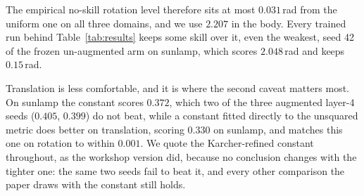 The empirical no-skill rotation level therefore sits at most $0.031$\,rad from the uniform
one on all three domains, and we use $2.207$ in the body. Every trained run behind
Table~\ref{tab:results} keeps some skill over it, even the weakest, seed 42 of the frozen
un-augmented arm on sunlamp, which scores $2.048$\,rad and keeps $0.15$\,rad.

Translation is less comfortable, and it is where the second caveat matters most. On sunlamp
the constant scores $0.372$, which two of the three augmented layer-4 seeds ($0.405$, $0.399$)
do not beat, while a constant fitted directly to the unsquared metric does better on
translation, scoring
$0.330$ on sunlamp, and matches this one on rotation to within $0.001$. We quote the
Karcher-refined constant throughout, as the workshop version did, because no conclusion
changes with the tighter one: the same two seeds fail to beat it, and every other comparison
the paper draws with the constant still holds.
